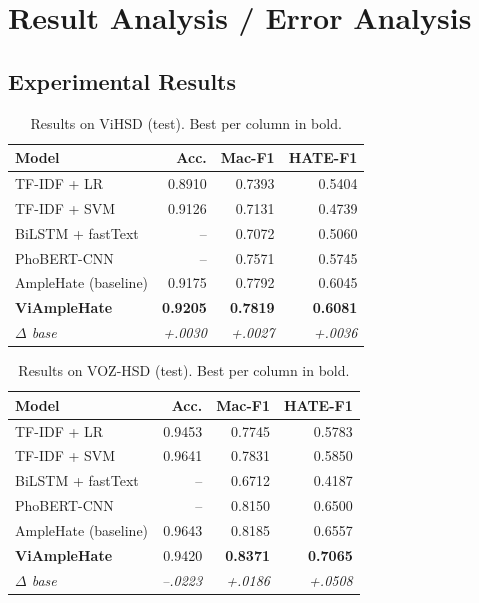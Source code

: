 \documentclass[11pt]{article}
\begin{document}
\section{Result Analysis / Error Analysis}

\subsection{Experimental Results}

\begin{table}[t]
  \centering
  \small
  \begin{tabular}{lrrr}
    \toprule
    \textbf{Model} & \textbf{Acc.} & \textbf{Mac-F1} & \textbf{HATE-F1} \\
    \midrule
    TF-IDF + LR          & 0.8910 & 0.7393 & 0.5404 \\
    TF-IDF + SVM         & 0.9126 & 0.7131 & 0.4739 \\
    BiLSTM + fastText    & --     & 0.7072 & 0.5060 \\
    PhoBERT-CNN          & --     & 0.7571 & 0.5745 \\
    AmpleHate (baseline) & 0.9175 & 0.7792 & 0.6045 \\
    \textbf{ViAmpleHate} & \textbf{0.9205} & \textbf{0.7819} & \textbf{0.6081} \\
    \textit{$\Delta$ base} & \textit{+.0030} & \textit{+.0027} & \textit{+.0036} \\
    \bottomrule
  \end{tabular}
  \caption{Results on ViHSD (test). Best per column in bold.}
  \label{tab:vihsd}
\end{table}

\begin{table}[t]
  \centering
  \small
  \begin{tabular}{lrrr}
    \toprule
    \textbf{Model} & \textbf{Acc.} & \textbf{Mac-F1} & \textbf{HATE-F1} \\
    \midrule
    TF-IDF + LR          & 0.9453 & 0.7745 & 0.5783 \\
    TF-IDF + SVM         & 0.9641 & 0.7831 & 0.5850 \\
    BiLSTM + fastText    & --     & 0.6712 & 0.4187 \\
    PhoBERT-CNN          & --     & 0.8150 & 0.6500 \\
    AmpleHate (baseline) & 0.9643 & 0.8185 & 0.6557 \\
    \textbf{ViAmpleHate} & 0.9420 & \textbf{0.8371} & \textbf{0.7065} \\
    \textit{$\Delta$ base} & \textit{--.0223} & \textit{+.0186} & \textit{+.0508} \\
    \bottomrule
  \end{tabular}
  \caption{Results on VOZ-HSD (test). Best per column in bold.}
  \label{tab:voz}
\end{table}
\end{document}
